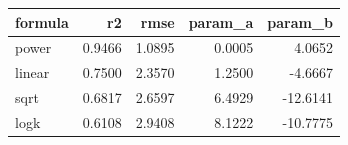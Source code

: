 \begin{tabular}{lrrrr}
\toprule
formula & r2 & rmse & param\_a & param\_b \\
\midrule
power & 0.9466 & 1.0895 & 0.0005 & 4.0652 \\
linear & 0.7500 & 2.3570 & 1.2500 & -4.6667 \\
sqrt & 0.6817 & 2.6597 & 6.4929 & -12.6141 \\
logk & 0.6108 & 2.9408 & 8.1222 & -10.7775 \\
\bottomrule
\end{tabular}
